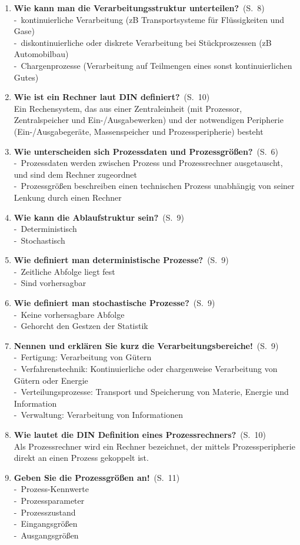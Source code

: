 \documentclass[a4paper,12pt]{article}
\newcommand{\question}[3]{\pagebreak[3]\item {\textbf{#1?}}\ (S.\ #2)#3}
\newcommand{\statement}[3]{\pagebreak[3]\item {\textbf{#1!}}\ (S.\ #2)#3}
\newcommand{\catchword}[1]{\\-\ #1}
\newcommand{\normaltext}[1]{\\#1}
\newcommand{\page}[1]{#1}
\begin{document}
\begin{enumerate}
    \question{Wie kann man die Verarbeitungsstruktur unterteilen}{\page{8}}
  {
    \catchword{kontinuierliche Verarbeitung (zB Transportsysteme für Flüssigkeiten und Gase)}
    \catchword{diskontinuierliche oder diskrete Verarbeitung bei Stückproszessen (zB Automobilbau)}
    \catchword{Chargenprozesse (Verarbeitung auf Teilmengen eines sonst kontinuierlichen Gutes)}
  }

    \question{Wie ist ein Rechner laut DIN definiert}{\page{10}}
  {
    \normaltext{Ein Rechensystem, das aus einer Zentraleinheit (mit Prozessor, Zentralspeicher und 
     Ein-/Ausgabewerken) und der notwendigen Peripherie (Ein-/Ausgabegeräte, Massenspeicher und
     Prozessperipherie) besteht}
  }

  \question{Wie unterscheiden sich Prozessdaten und Prozessgrößen}{\page{6}}
  {
    \catchword{Prozessdaten werden zwischen Prozess und Prozessrechner ausgetauscht, und sind 
    dem Rechner zugeordnet}
    \catchword{Prozessgrößen beschreiben einen technischen Prozess unabhängig von seiner Lenkung
    durch einen Rechner}
  }

  \question{Wie kann die Ablaufstruktur sein}{\page{9}}
  {
    \catchword{Deterministisch}
    \catchword{Stochastisch}
  }

  \question{Wie definiert man deterministische Prozesse}{\page{9}}
  {
    \catchword{Zeitliche Abfolge liegt fest}
    \catchword{Sind vorhersagbar}
  }

  \question{Wie definiert man stochastische Prozesse}{\page{9}}
  {
    \catchword{Keine vorhersagbare Abfolge}
    \catchword{Gehorcht den Gestzen der Statistik}
  } 

  \statement{Nennen und erklären Sie kurz die Verarbeitungsbereiche}{\page{9}}
  {
    \catchword{Fertigung: Verarbeitung von Gütern}
    \catchword{Verfahrenstechnik: Kontinuierliche oder chargenweise Verarbeitung
               von Gütern oder Energie}
    \catchword{Verteilungsprozesse: Transport und Speicherung von Materie, Energie und Information}
    \catchword{Verwaltung: Verarbeitung von Informationen}
  }

  \question{Wie lautet die DIN Definition eines Prozessrechners}{\page{10}}
  {
    \normaltext{Als Prozessrechner wird ein Rechner bezeichnet, der mittels Prozessperipherie direkt
                an einen Prozess gekoppelt ist.}
  }

  \statement{Geben Sie die Prozessgrößen an}{\page{11}}
  {
    \catchword{Prozess-Kennwerte}
    \catchword{Prozessparameter}
    \catchword{Prozesszustand}
    \catchword{Eingangsgrößen}
    \catchword{Ausgangsgrößen}
  }


\end{enumerate}
\end{document}

